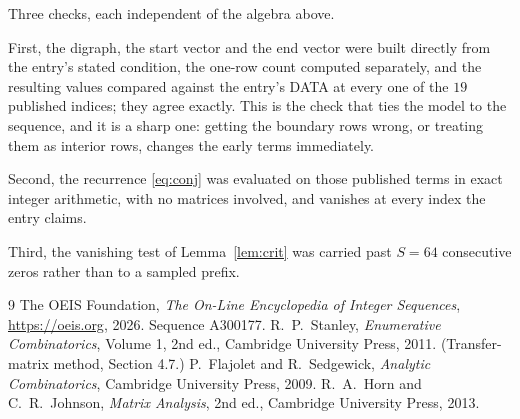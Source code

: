 \documentclass[11pt,a4paper]{article}
\theoremstyle{plain}
\theoremstyle{definition}
\begin{document}
Three checks, each independent of the algebra above.

First, the digraph, the start vector and the end vector were built directly from the
entry's stated condition, the one-row count computed separately, and the resulting values
compared against the entry's DATA at every one of the $19$ published indices; they
agree exactly. This is the check that ties the model to the sequence, and it is a sharp one:
getting the boundary rows wrong, or treating them as interior rows, changes the early terms
immediately.

Second, the recurrence \eqref{eq:conj} was evaluated on those published terms in exact
integer arithmetic, with no matrices involved, and vanishes at every index the entry claims.

Third, the vanishing test of Lemma~\ref{lem:crit} was carried past $S=64$ consecutive
zeros rather than to a sampled prefix.

\begin{thebibliography}{9}
 The OEIS Foundation, \emph{The On-Line Encyclopedia of Integer
Sequences}, \url{https://oeis.org}, 2026. Sequence A300177.
 R.~P.~Stanley, \emph{Enumerative Combinatorics}, Volume 1, 2nd ed.,
Cambridge University Press, 2011. (Transfer-matrix method, Section 4.7.)
 P.~Flajolet and R.~Sedgewick, \emph{Analytic Combinatorics}, Cambridge
University Press, 2009.
 R.~A.~Horn and C.~R.~Johnson, \emph{Matrix Analysis}, 2nd ed., Cambridge
University Press, 2013.
\end{thebibliography}
\end{document}
